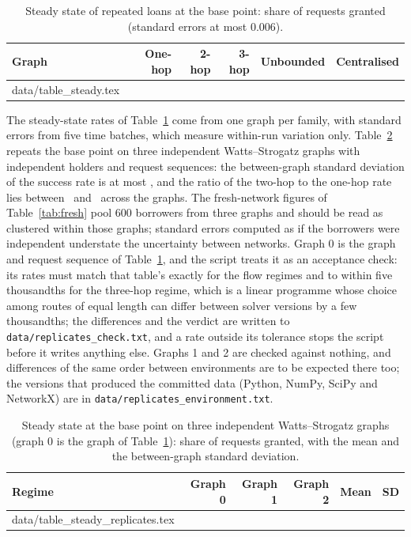 \documentclass[11pt]{article}
\makeatletter
\theoremstyle{plain}
\theoremstyle{definition}
\newcommand{\inputrows}[1]{\@@input #1 }
\makeatother
\begin{document}
\begin{table}[ht]
  \centering\small
  \caption{Steady state of repeated loans at the base point: share of requests granted (standard
  errors at most 0.006).}
  \label{tab:steady}
  \begin{tabular}{lrrrrr}
    \toprule
    Graph & One-hop & 2-hop & 3-hop & Unbounded & Centralised \\
    \midrule
    \inputrows{data/table_steady.tex}
    \bottomrule
  \end{tabular}
\end{table}

The steady-state rates of Table~\ref{tab:steady} come from one graph per family, with standard errors
from five time batches, which measure within-run variation only. Table~\ref{tab:replicates} repeats
the base point on three independent Watts--Strogatz graphs with independent holders and request
sequences: the between-graph standard deviation of the success rate is at most \SteadySdMax, and
the ratio of the two-hop to the one-hop rate lies between \TwoHopRatioMin\ and \TwoHopRatioMax\
across the graphs. The fresh-network figures of Table~\ref{tab:fresh} pool 600 borrowers from three
graphs and should be read as clustered within those graphs; standard errors computed as if the
borrowers were independent understate the uncertainty between networks. Graph 0 is the graph and
request sequence of Table~\ref{tab:steady}, and the script treats it as an acceptance check: its
rates must match that table's exactly for the flow regimes and to within five thousandths for the
three-hop regime, which is a linear programme whose choice among routes of equal length can differ
between solver versions by a few thousandths; the differences and the verdict are written to
\texttt{data/replicates\_check.txt}, and a rate outside its tolerance stops the script before it
writes anything else. Graphs 1 and 2 are checked against nothing, and differences of the same order
between environments are to be expected there too; the versions that produced the committed data
(Python, NumPy, SciPy and NetworkX) are in \texttt{data/replicates\_environment.txt}.

\begin{table}[ht]
  \centering\small
  \caption{Steady state at the base point on three independent Watts--Strogatz graphs (graph 0 is
  the graph of Table~\ref{tab:steady}): share of requests granted, with the mean and the
  between-graph standard deviation.}
  \label{tab:replicates}
  \begin{tabular}{lrrrrr}
    \toprule
    Regime & Graph 0 & Graph 1 & Graph 2 & Mean & SD \\
    \midrule
    \inputrows{data/table_steady_replicates.tex}
    \bottomrule
  \end{tabular}
\end{table}
\end{document}

